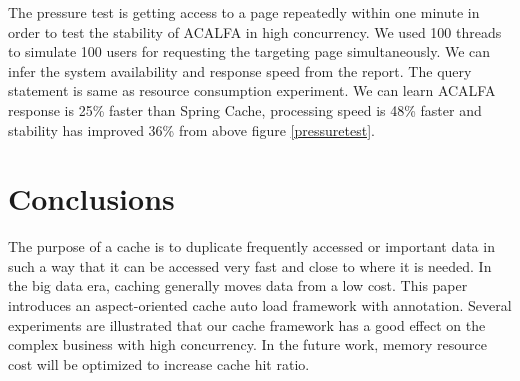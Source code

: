 \documentclass{singlecol-new}
\theoremstyle{TH}{
\newtheorem{lemma}{Lemma}
\newtheorem{theorem}[lemma]{Theorem}
\newtheorem{corrolary}[lemma]{Corrolary}
\newtheorem{conjecture}[lemma]{Conjecture}
\newtheorem{proposition}[lemma]{Proposition}
\newtheorem{claim}[lemma]{Claim}
\newtheorem{stheorem}[lemma]{Wrong Theorem}
}
\theoremstyle{THrm}{
\newtheorem{definition}{Definition}[section]
\newtheorem{question}{Question}[section]
\newtheorem{remark}{Remark}
\newtheorem{scheme}{Scheme}
}
\theoremstyle{THhit}{
\newtheorem{case}{Case}[section]
}
\begin{document}
 The pressure test is getting access to a page repeatedly within one minute in order to test the stability of ACALFA in high concurrency. We used 100 threads to simulate 100 users for requesting the targeting page simultaneously. We can infer the system availability and response speed from the report. The query statement is same as resource consumption experiment. We can learn ACALFA response is 25\% faster than Spring Cache, processing speed is 48\% faster and stability has improved 36\% from above figure \ref{pressuretest}.

\section{Conclusions}
\label{Conclusions}
The purpose of a cache is to duplicate frequently accessed or important data in such a way that it can be accessed very fast and close to where it is needed. In the big data era, caching generally moves data from a low cost. This paper introduces an aspect-oriented cache auto load framework with annotation. Several experiments are illustrated that our cache framework has a good effect on the complex business with high concurrency. In the future work, memory resource cost will be optimized to increase cache hit ratio.





%
%
%



\end{document}
